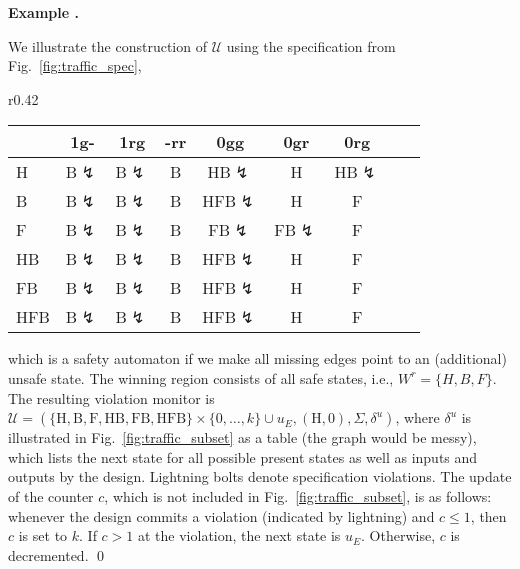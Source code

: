 \documentclass{llncs}
\newcounter{exacounter}
\newenvironment{exa}{
\refstepcounter{exacounter}
\smallskip\noindent
\textbf{Example \theexacounter.}
}{\vspace{2mm}}
\newcommand{\dalph}{\Sigma}
\newcommand{\err}{{\color{darkred}$\lightning$}}
\begin{document}
\begin{exa}
We illustrate the construction of $\mathcal{U}$ using the specification 
from Fig.~\ref{fig:traffic_spec}, 
\begin{wrapfigure}[10]{r}{0.42\textwidth}
\vspace{-0.7cm}
\begin{tabular}{l|cccccccc}
    &1g-   &1rg   &-rr &0gg     &0gr    &0rg    \\
\hline
H   &B\err &B\err &B   &HB\err  &H      &HB\err \\
B   &B\err &B\err &B   &HFB\err &H      &F      \\
F   &B\err &B\err &B   &FB\err  &FB\err &F      \\
HB  &B\err &B\err &B   &HFB\err &H      &F      \\
FB  &B\err &B\err &B   &HFB\err &H      &F      \\
HFB &B\err &B\err &B   &HFB\err &H      &F      \\
\hline
\end{tabular}
\caption{$\delta^u$ for the spec from Fig.~\ref{fig:traffic_spec}.}
\label{fig:traffic_subset}
\end{wrapfigure}
which is a safety automaton if we make all missing edges point to an 
(additional) unsafe state.  The winning region consists of all safe 
states, i.e., $W^r = \{H,B,F\}$.  The resulting violation monitor is 
$\mathcal{U}= 
(\{\text{H},\text{B},\text{F},\text{HB},\text{FB},\text{HFB}\} 
\times\{0, \ldots, k\}\cup u_E, (\text{H},0), \dalph, \delta^u)$, where 
$\delta^u$ is illustrated in Fig.~\ref{fig:traffic_subset} as a table
(the graph would be messy), which lists the next state for all possible 
present states as well as inputs and outputs by the design.  Lightning 
bolts denote specification 
violations. The update of the counter $c$, which is not included in 
Fig.~\ref{fig:traffic_subset}, is as follows: whenever the design 
commits a violation (indicated by lightning) and $c\leq 1$, then $c$ is 
set to $k$. If $c > 1$ at the violation, the next state is $u_E$.  
Otherwise, $c$ is decremented.  \qed

\end{exa}
\end{document}
